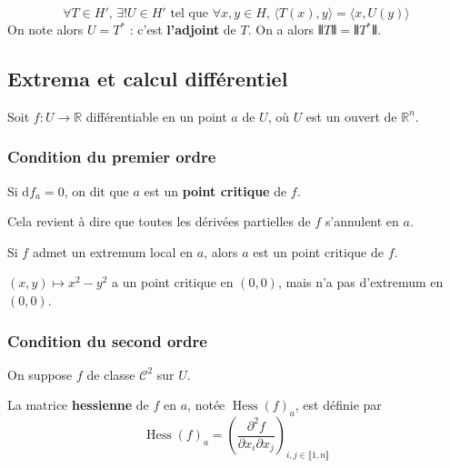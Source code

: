 	\begin{corollary}
		\[ \forall T \in H', \, \exists! U \in H' \text{ tel que } \forall x, y \in H, \, \langle T(x), y \rangle = \langle x, U(y) \rangle \]
		On note alors $U = T^*$ : c'est \textbf{l'adjoint} de $T$. On a alors $\VERT T \VERT = \VERT T^* \VERT$.
	\end{corollary}

	\subsection{Extrema et calcul différentiel}

	Soit $f : U \rightarrow \mathbb{R}$ différentiable en un point $a$ de $U$, où $U$ est un ouvert de $\mathbb{R}^n$.

	\subsubsection{Condition du premier ordre}


	\begin{definition}
		Si $\mathrm{d}f_a = 0$, on dit que $a$ est un \textbf{point critique} de $f$.
	\end{definition}

	\begin{remark}
		Cela revient à dire que toutes les dérivées partielles de $f$ s'annulent en $a$.
	\end{remark}

	\begin{proposition}
		Si $f$ admet un extremum local en $a$, alors $a$ est un point critique de $f$.
	\end{proposition}


	\begin{cexample}
		$(x,y) \mapsto x^2-y^2$ a un point critique en $(0,0)$, mais n'a pas d'extremum en $(0,0)$.
	\end{cexample}

	\subsubsection{Condition du second ordre}


	On suppose $f$ de classe $\mathcal{C}^2$ sur $U$.

	\begin{definition}
		La matrice \textbf{hessienne} de $f$ en $a$, notée $\operatorname{Hess}(f)_a$, est définie par
		\[ \operatorname{Hess}(f)_a = \left( \frac{\partial^2 f}{\partial x_i \partial x_j} \right)_{i,j \in \llbracket 1, n \rrbracket} \]
	\end{definition}

